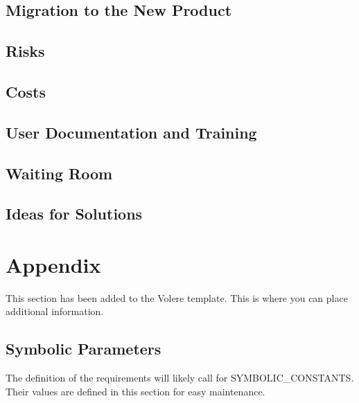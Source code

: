 \documentclass[12pt, titlepage]{article}
\begin{document}
\subsection{Migration to the New Product}

\subsection{Risks}

\subsection{Costs}

\subsection{User Documentation and Training}

\subsection{Waiting Room}

\subsection{Ideas for Solutions}





\newpage

\section{Appendix}

This section has been added to the Volere template.  This is where you can place
additional information.

\subsection{Symbolic Parameters}

The definition of the requirements will likely call for SYMBOLIC\_CONSTANTS.
Their values are defined in this section for easy maintenance.
\end{document}
